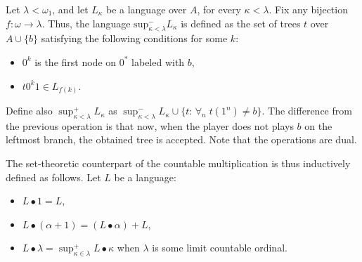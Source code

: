 Let $\lambda < \omega_1$, and let  $L_\kappa$ be a language over $A$,
for every $\kappa<\lambda$. Fix any bijection $f: \omega \to \lambda$. Thus, the language $\mathrm{sup}^-_{\kappa<\lambda} L_\kappa$ is defined as the set of trees $t$ over $A\cup\{b\}$ satisfying the following conditions for some $k$:
\begin{itemize}
\item $0^k$ is the first node on $0^*$ labeled with $b$,
\item $t0^k1 \in L_{f(k)}$.
\end{itemize}

Define also
$\sup^+ _{\kappa<\lambda} L_\kappa$ as $\sup^-_{\kappa<\lambda} L_\kappa\cup \{t :\, \forall_n\; t(1^n)\neq b\}$.
The difference from the previous operation is that now, when the
player does not plays $b$ on the leftmost branch, the obtained tree is
accepted. Note that the operations are dual. 
%





The set-theoretic counterpart of the countable multiplication is thus  inductively defined as follows. 
Let $L$ be a language: 
\begin{itemize}
\item $L \bullet 1 = L$, 
\item $L \bullet (\alpha + 1) = (L \bullet \alpha)+L$, 
\item $L \bullet \lambda = \sup^+_{\kappa \in \lambda} L \bullet \kappa$ when $\lambda$  is some limit countable ordinal.
\end{itemize}

